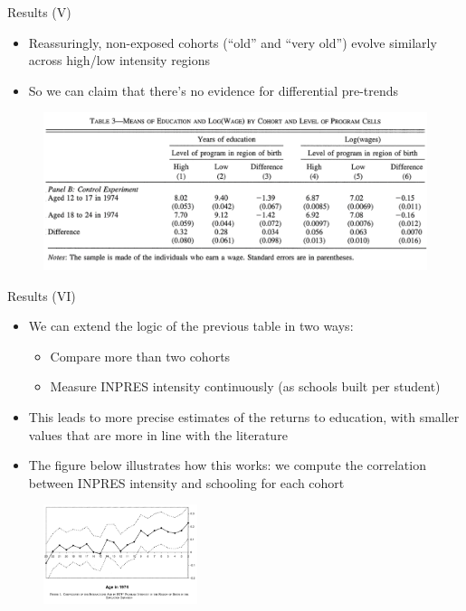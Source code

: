 \documentclass[11pt,notes=hide,aspectratio=169,mathserif]{beamer}
\begin{document}
\begin{frame}{Results (V)}
\begin{itemize}
\item Reassuringly, non-exposed cohorts (``old'' and ``very old'') evolve similarly across high/low intensity regions
\item So we can claim that there's no evidence for differential pre-trends 
\end{itemize}
\begin{figure}
    \centering
    \includegraphics[width=\textwidth]{inputs/Table3b.png}
\end{figure}
\end{frame}

\begin{frame}{Results (VI)}
\begin{itemize}
\item We can extend the logic of the previous table in two ways:
\begin{itemize}
    \item Compare more than two cohorts
    \item Measure INPRES intensity continuously (as schools built per student)
\end{itemize}
\item This leads to more precise estimates of the returns to education, with smaller values that are more in line with the literature
\item The figure below illustrates how this works: we compute the correlation between INPRES intensity and schooling for each cohort
\end{itemize}
\begin{figure}
    \centering
    \includegraphics[width=0.4\textwidth]{inputs/Figure1.png}
\end{figure}
\end{frame}
\end{document}
